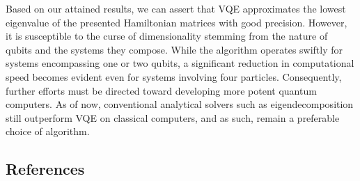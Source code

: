 \documentclass[onecolumn,10pt,cleanfoot]{asme2ej}
\begin{document}
Based on our attained results, we can assert that VQE approximates the lowest eigenvalue of the presented Hamiltonian matrices with good precision. However, it is susceptible to the curse of dimensionality stemming from the nature of qubits and the systems they compose. While the algorithm operates swiftly for systems encompassing one or two qubits, a significant reduction in computational speed becomes evident even for systems involving four particles. Consequently, further efforts must be directed toward developing more potent quantum computers. As of now, conventional analytical solvers such as eigendecomposition still outperform VQE on classical computers, and as such, remain a preferable choice of algorithm.

\subsection{References}
\end{document}
